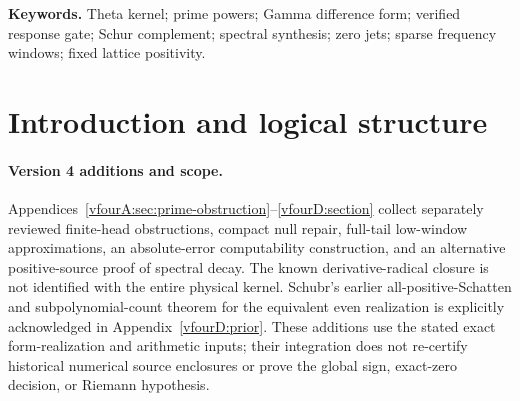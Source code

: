 \documentclass[11pt,a4paper]{article}
\numberwithin{equation}{section}
\theoremstyle{definition}\newtheorem{definition}[theorem]{Definition}
\theoremstyle{remark}\newtheorem{remark}[theorem]{Remark}
\begin{document}
\begin{abstract}
the further obligations of a cofinal certificate. Uniform two-sided operator brackets separate response accuracy from source dimension, while an asymptotic obstruction shows why a fixed graph debit cannot certify an exhaustive raw-source family. Each result states its norm, domain, geometry, and verification boundary. The qualitative prime-number-theorem refinement supplies no effective final height here. A later complete single-band estimate covers widths $o(\log T\sqrt{\log\log T})$ in ordinary $L^2$, and a conservative fixed multiple of this scale gives eventual positivity; Appendix~\ref{app:growing-zero-bands} retains the precise hypotheses and full proof. These restricted positivity results do not establish positivity on arbitrary unions or the full zero family. The global half inequality and the Riemann hypothesis remain unproved.
 New appendices analyze finite-prime artifacts, exact known-radical repair, quantitative low-window tail compression, and absolute-error computability of the centered ground energy under the stated inputs. A source-compression proof gives a subpolynomial negative-count bound and all-positive-exponent Schatten membership; these qualitative conclusions were previously obtained by Schubr for the equivalent even realization. None resolves the global sign or the Riemann hypothesis.
\end{abstract}
\noindent\textbf{Keywords.} Theta kernel; prime powers; Gamma difference form; verified response gate; Schur complement; spectral synthesis; zero jets; sparse frequency windows; fixed lattice positivity.
\clearpage\setcounter{tocdepth}{1}\tableofcontents\clearpage

\section{Introduction and logical structure}\label{sec:intro}

\paragraph{Version 4 additions and scope.}
Appendices~\ref{vfourA:sec:prime-obstruction}--\ref{vfourD:section} collect separately reviewed finite-head obstructions, compact null repair, full-tail low-window approximations, an absolute-error computability construction, and an alternative positive-source proof of spectral decay. The known derivative-radical closure is not identified with the entire physical kernel. Schubr's earlier all-positive-Schatten and subpolynomial-count theorem for the equivalent even realization is explicitly acknowledged in Appendix~\ref{vfourD:prior}. These additions use the stated exact form-realization and arithmetic inputs; their integration does not re-certify historical numerical source enclosures or prove the global sign, exact-zero decision, or Riemann hypothesis.
\end{document}

